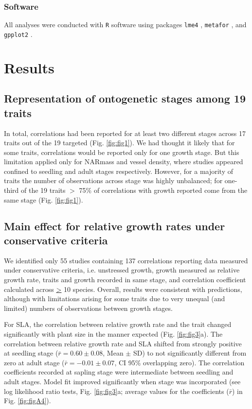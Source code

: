 \documentclass[a4paper,11pt]{article}
\begin{document}
\subsubsection*{Software}

All analyses were conducted with \texttt{R} software \citep{Ralanguageanden:2014wf} using packages \texttt{lme4} \citep{Bates-2014}, \texttt{metafor} \citep{Viechtbauer-2010}, and \texttt{gpplot2} \citep{Wickham:2009}.


\section*{Results}\label{results}

\subsection*{Representation of ontogenetic stages among 19 traits}
In total, correlations had been reported for at least two different stages across 17 traits out of the 19 targeted (Fig. \ref{fig:fig1}). We had thought it likely that for some traits, correlations would be reported only for one growth stage. But this limitation applied only for NARmass and vessel density, where studies appeared confined to seedling and adult stages respectively. However, for a majority of traits the number of observations across stage was highly unbalanced; for one-third of the 19 traits $>$ 75\% of correlations with growth reported come from the same stage (Fig. \ref{fig:fig1}).

\subsection*{Main effect for relative growth rates under conservative criteria}

We identified only 55 studies containing 137 correlations reporting data measured under conservative criteria, i.e. unstressed growth, growth measured as relative growth rate, traits and growth recorded in same stage, and correlation coefficient calculated across \underline{\textgreater} 10 species. Overall, results were consistent with predictions, although with limitations arising for some traits due to very unequal (and limited) numbers of observations between growth stages.

For SLA, the correlation between relative growth rate and the trait changed significantly with plant size in the manner expected (Fig. \ref{fig:fig3}a). The correlation between relative growth rate and SLA shifted from strongly positive at seedling stage ($\bar{r}=0.60 \pm 0.08$, Mean $\pm$ SD) to not significantly different from zero at adult stage ($\bar{r}= -0.01 \pm 0.07$, CI 95\% overlapping zero). The correlation coefficients recorded at sapling stage were intermediate between seedling and adult stages. Model fit improved significantly when stage was incorporated (see log likelihood ratio tests, Fig. \ref{fig:fig3}a; average values for the coefficients ($\bar{r}$) in Fig. \ref{fig:figA4}).
\end{document}
